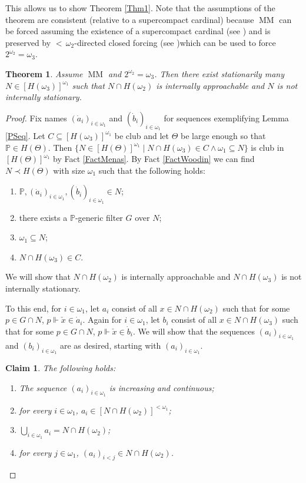 \documentclass[a4paper]{amsart}
\theoremstyle{definition}
\theoremstyle{remark}
\theoremstyle{plain}
\newtheorem{mysen}[mydef]{Theorem}
\newtheorem*{myclaim}{Claim}
\numberwithin{mydef}{section}
\DeclareMathOperator{\MM}{MM}
\newcommand{\dP}{\mathbb{P}}
\begin{document}
	This allows us to show Theorem \ref{Thm1}. Note that the assumptions of the theorem are consistent (relative to a supercompact cardinal) because $\MM$ can be forced assuming the existence of a supercompact cardinal (see \cite[Theorem 5]{ForemanMagidorShelahMM}) and is preserved by ${<}\,\omega_2$-directed closed forcing (see \cite[Theorem 4.3]{LarsonSepStatRefl})which can be used to force $2^{\omega_2}=\omega_3$.
	
	\begin{mysen}\label{MMThm}
		Assume $\MM$ and $2^{\omega_2}=\omega_3$. Then there exist stationarily many $N\in[H(\omega_3)]^{\omega_1}$ such that $N\cap H(\omega_2)$ is internally approachable and $N$ is not internally stationary.
	\end{mysen}
	
	\begin{proof}
		Fix names $(\dot{a}_i)_{i\in\omega_1}$ and $(\dot{b}_i)_{i\in\omega_1}$ for sequences exemplifying Lemma \ref{PSeq}. Let $C\subseteq[H(\omega_3)]^{\omega_1}$ be club and let $\Theta$ be large enough so that $\dP\in H(\Theta)$. Then $\{N\in[H(\Theta)]^{\omega_1}\;|\;N\cap H(\omega_3)\in C\wedge\omega_1\subseteq N\}$ is club in $[H(\Theta)]^{\omega_1}$ by Fact \ref{FactMenas}. By Fact \ref{FactWoodin} we can find $N\prec H(\Theta)$ with size $\omega_1$ such that the following holds:
		
		\begin{enumerate}
			\item $\dP,(\dot{a}_i)_{i\in\omega_1},(\dot{b}_i)_{i\in\omega_1}\in N$;
			\item there exists a $\dP$-generic filter $G$ over $N$;
			\item $\omega_1\subseteq N$;
			\item $N\cap H(\omega_3)\in C$.
		\end{enumerate}
		
		We will show that $N\cap H(\omega_2)$ is internally approachable and $N\cap H(\omega_3)$ is not internally stationary.
		
		To this end, for $i\in\omega_1$, let $a_i$ consist of all $x\in N\cap H(\omega_2)$ such that for some $p\in G\cap N$, $p\Vdash\check{x}\in\dot{a}_i$. Again for $i\in\omega_1$, let $b_i$ consist of all $x\in N\cap H(\omega_3)$ such that for some $p\in G\cap N$, $p\Vdash\check{x}\in\dot{b}_i$. We will show that the sequences $(a_i)_{i\in\omega_1}$ and $(b_i)_{i\in\omega_1}$ are as desired, starting with $(a_i)_{i\in\omega_1}$.
		
		\begin{myclaim}
			The following holds:
			\begin{enumerate}
				\item The sequence $(a_i)_{i\in\omega_1}$ is increasing and continuous;
				\item for every $i\in\omega_1$, $a_i\in[N\cap H(\omega_2)]^{<\omega_1}$;
				\item $\bigcup_{i\in\omega_1}a_i=N\cap H(\omega_2)$;
				\item for every $j\in\omega_1$, $(a_i)_{i<j}\in N\cap H(\omega_2)$.
			\end{enumerate}
		\end{myclaim}
		

\end{proof}
\end{document}
